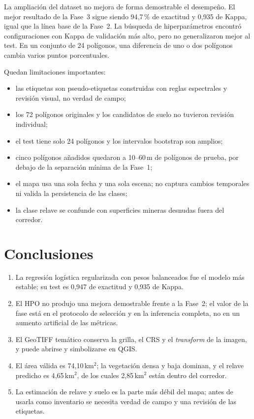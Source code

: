 \documentclass{article}
\begin{document}
La ampliación del dataset no mejora de forma demostrable el desempeño. El mejor resultado de la Fase~3 sigue siendo 94{,}7\,\% de exactitud y 0{,}935 de Kappa, igual que la línea base de la Fase~2. La búsqueda de hiperparámetros encontró configuraciones con Kappa de validación más alto, pero no generalizaron mejor al test. En un conjunto de 24 polígonos, una diferencia de uno o dos polígonos cambia varios puntos porcentuales.

Quedan limitaciones importantes:

\begin{itemize}
 \item las etiquetas son pseudo-etiquetas construidas con reglas espectrales y revisión visual, no verdad de campo;
 \item los 72 polígonos originales y los candidatos de suelo no tuvieron revisión individual;
 \item el test tiene solo 24 polígonos y los intervalos bootstrap son amplios;
 \item cinco polígonos añadidos quedaron a 10--60\,m de polígonos de prueba, por debajo de la separación mínima de la Fase~1;
 \item el mapa usa una sola fecha y una sola escena; no captura cambios temporales ni valida la persistencia de las clases;
 \item la clase relave se confunde con superficies mineras desnudas fuera del corredor.
\end{itemize}

\section{Conclusiones}

\begin{enumerate}
 \item La regresión logística regularizada con pesos balanceados fue el modelo más estable; su test es 0{,}947 de exactitud y 0{,}935 de Kappa.
 \item El HPO no produjo una mejora demostrable frente a la Fase~2; el valor de la fase está en el protocolo de selección y en la inferencia completa, no en un aumento artificial de las métricas.
 \item El GeoTIFF temático conserva la grilla, el CRS y el \emph{transform} de la imagen, y puede abrirse y simbolizarse en QGIS.
 \item El área válida es 74{,}10\,km$^2$; la vegetación densa y baja dominan, y el relave predicho es 4{,}65\,km$^2$, de los cuales 2{,}85\,km$^2$ están dentro del corredor.
 \item La estimación de relave y suelo es la parte más débil del mapa; antes de usarla como inventario se necesita verdad de campo y una revisión de las etiquetas.
\end{enumerate}
\end{document}
